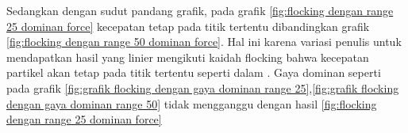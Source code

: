 \hspace{0.6cm}Sedangkan dengan sudut pandang grafik, pada grafik \ref{fig:flocking dengan range 25 dominan force} kecepatan tetap pada titik tertentu dibandingkan grafik \ref{fig:flocking dengan range 50 dominan force}. Hal ini karena variasi penulis untuk mendapatkan hasil yang linier mengikuti kaidah flocking bahwa kecepatan partikel akan tetap pada titik tertentu seperti dalam \citep{Bajec2007}. Gaya dominan seperti pada grafik \ref{fig:grafik flocking dengan gaya dominan range 25},\ref{fig:grafik flocking dengan gaya dominan range 50} tidak mengganggu dengan hasil \ref{fig:flocking dengan range 25 dominan force}

